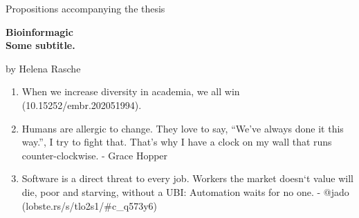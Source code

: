 \begin{center}
Propositions accompanying the thesis

\textbf{Bioinformagic \ \\Some subtitle.}

by Helena Rasche
\end{center}



\begin{enumerate}


\item When we increase diversity in academia, we all win (10.15252/embr.202051994).
\item Humans are allergic to change. They love to say, ``We've always done it this way.'', I try to fight that. That's why I have a clock on my wall that runs counter-clockwise. - Grace Hopper
\item Software is a direct threat to every job. Workers the market doesn`t value will die, poor and starving, without a UBI: Automation waits for no one. - @jado (lobste.rs/s/tlo2s1/#c_q573y6)
\end{enumerate}
